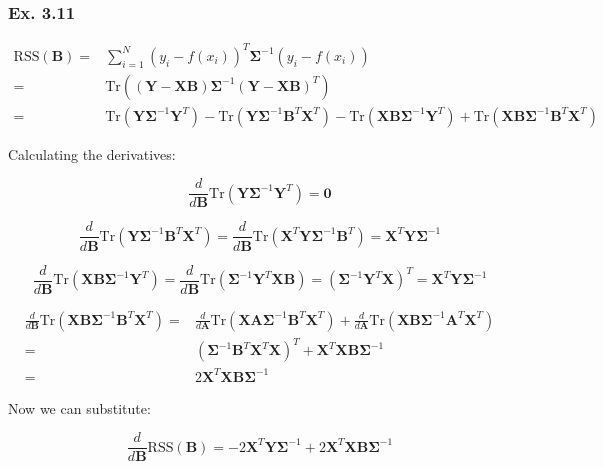 \documentclass{article}
\begin{document}
\subsubsection{Ex. 3.11}

\[
\begin{split}
\text{RSS}(\mathbf{B}) =& \sum_{i=1}^{N} (y_i -f(x_i))^T \mathbf{\Sigma}^{-1} (y_i - f(x_i))\\
=& \text{Tr}\left( (\mathbf{Y} - \mathbf{X} \mathbf{B}) \mathbf{\Sigma}^{-1} (\mathbf{Y} - \mathbf{X} \mathbf{B})^T \right)\\
=&\text{Tr}(\mathbf{Y} \mathbf{\Sigma}^{-1} \mathbf{Y}^T) - \text{Tr}(\mathbf{Y} \mathbf{\Sigma}^{-1} \mathbf{B}^T \mathbf{X}^T) - \text{Tr}(\mathbf{X}\mathbf{B}\mathbf{\Sigma}^{-1}\mathbf{Y}^T) + \text{Tr}(\mathbf{X} \mathbf{B} \mathbf{\Sigma}^{-1} \mathbf{B}^T \mathbf{X}^T)
\end{split}
\]

Calculating the derivatives:

\[
\frac{d}{d\mathbf{B}}\text{Tr}(\mathbf{Y} \mathbf{\Sigma}^{-1} \mathbf{Y}^T) = \mathbf{0}
\]

\[
\frac{d}{d\mathbf{B}}\text{Tr}(\mathbf{Y} \mathbf{\Sigma}^{-1} \mathbf{B}^T \mathbf{X}^T) = \frac{d}{d\mathbf{B}}\text{Tr}(\mathbf{X}^T \mathbf{Y} \mathbf{\Sigma}^{-1} \mathbf{B}^T) = \mathbf{X}^T \mathbf{Y} \mathbf{\Sigma}^{-1}
\]

\[
\frac{d}{d\mathbf{B}}\text{Tr}(\mathbf{X}\mathbf{B}\mathbf{\Sigma}^{-1}\mathbf{Y}^T) = \frac{d}{d\mathbf{B}}\text{Tr}(\mathbf{\Sigma}^{-1}\mathbf{Y}^T\mathbf{X}\mathbf{B}) = (\mathbf{\Sigma}^{-1}\mathbf{Y}^T\mathbf{X})^T = \mathbf{X}^T \mathbf{Y} \mathbf{\Sigma}^{-1}
\]

\[
\begin{split}
\frac{d}{d\mathbf{B}}\text{Tr}(\mathbf{X} \mathbf{B} \mathbf{\Sigma}^{-1} \mathbf{B}^T \mathbf{X}^T) =& \frac{d}{d\mathbf{A}}\text{Tr}(\mathbf{X} \mathbf{A} \mathbf{\Sigma}^{-1} \mathbf{B}^T \mathbf{X}^T) + \frac{d}{d\mathbf{A}}\text{Tr}(\mathbf{X} \mathbf{B} \mathbf{\Sigma}^{-1} \mathbf{A}^T \mathbf{X}^T)\\
=& (\mathbf{\Sigma}^{-1} \mathbf{B}^T \mathbf{X}^T \mathbf{X})^T + \mathbf{X}^T \mathbf{X} \mathbf{B} \mathbf{\Sigma}^{-1}\\
=& 2\mathbf{X}^T \mathbf{X} \mathbf{B} \mathbf{\Sigma}^{-1}
\end{split}
\]

Now we can substitute:

\[
\frac{d}{d\mathbf{B}} \text{RSS}(\mathbf{B}) = -2 \mathbf{X}^T \mathbf{Y} \mathbf{\Sigma}^{-1} + 2\mathbf{X}^T \mathbf{X} \mathbf{B} \mathbf{\Sigma}^{-1}
\]
\end{document}
